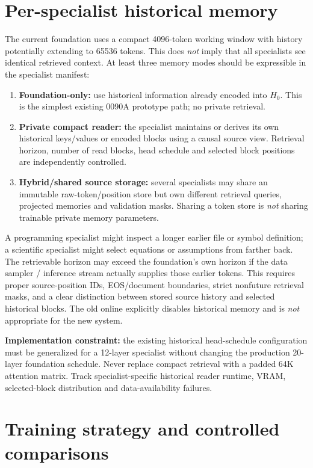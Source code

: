 \documentclass[11pt,letterpaper]{article}
\newcommand{\code}[1]{\path{#1}}
\begin{document}
\section{Per-specialist historical memory}
\label{sec:memory}
The current foundation uses a compact 4096-token working window with history potentially extending to 65536 tokens. This does \emph{not} imply that all specialists see identical retrieved context. At least three memory modes should be expressible in the specialist manifest:
\begin{enumerate}
\item \textbf{Foundation-only:} use historical information already encoded into $H_0$. This is the simplest existing 0090A prototype path; no private retrieval.
\item \textbf{Private compact reader:} the specialist maintains or derives its own historical keys/values or encoded blocks using a causal source view. Retrieval horizon, number of read blocks, head schedule and selected block positions are independently controlled.
\item \textbf{Hybrid/shared source storage:} several specialists may share an immutable raw-token/position store but own different retrieval queries, projected memories and validation masks. Sharing a token store is \emph{not} sharing trainable private memory parameters.
\end{enumerate}
A programming specialist might inspect a longer earlier file or symbol definition; a scientific specialist might select equations or assumptions from farther back. The retrievable horizon may exceed the foundation's own horizon if the data sampler / inference stream actually supplies those earlier tokens. This requires proper source-position IDs, EOS/document boundaries, strict nonfuture retrieval masks, and a clear distinction between stored source history and selected historical blocks. The old online \code{load_frozen_teacher()} explicitly disables historical memory and is \emph{not} appropriate for the new system.

\textbf{Implementation constraint:} the existing historical head-schedule configuration must be generalized for a 12-layer specialist without changing the production 20-layer foundation schedule. Never replace compact retrieval with a padded 64K attention matrix. Track specialist-specific historical reader runtime, VRAM, selected-block distribution and data-availability failures.

\section{Training strategy and controlled comparisons}
\label{sec:training}
\end{document}
